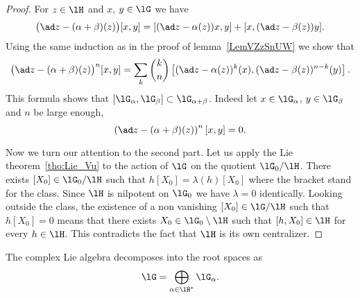 \begin{proof}
	For $z\in\lH$ and $x$, $y\in\lG$ we have
	\begin{equation}
		\big( \ad z-(\alpha+\beta)(z) \big)[x,y]=[ (\ad z-\alpha(z))x,y ]+[ x,(\ad z-\beta(z))y ].
	\end{equation}
	Using the same induction as in the proof of lemma~\ref{LemVZzSnUW} we show that
	\begin{equation}
		\big( \ad z-(\alpha+\beta)(z) \big)^n[x,y]=\sum_k \binom{k}{n}
		\left[
			(\ad z-\alpha(z))^k(x),(\ad z-\beta(z))^{n-k}(y)
			\right].
	\end{equation}
	This formula shows that $[\lG_{\alpha},\lG_{\beta}]\subset\lG_{\alpha+\beta}$. Indeed let $x\in\lG_{\alpha}$, $y\in\lG_{\beta}$ and $n$ be large enough,
	\begin{equation}
		\left( \ad z-(\alpha+\beta)(z) \right)^n[x,y]=0.
	\end{equation}

	Now we turn our attention to the second part. Let us apply the Lie theorem~\ref{tho:Lie_Vu} to the action of \( \lG\) on the quotient \( \lG_0/\lH\). There exists \( [X_0]\in\lG_0/\lH\) such that \( h[X_0]=\lambda(h)[X_0]\) where the bracket stand for the class. Since \( \lH\) is nilpotent on \( \lG_0\) we have \( \lambda=0\) identically. Looking outside the class, the existence of a non vanishing \( [X_0]\in\lG/\lH\) such that \( h[X_0]=0\) means that there exists \( X_0\in\lG_0\setminus\lH\) such that \( [h,X_0]\in\lH\) for every \( h\in\lH\). This contradicts the fact that \( \lH\) is its own centralizer.
\end{proof}

\begin{proposition}
	The complex Lie algebra decomposes into the root spaces as
	\begin{equation}
		\lG=\bigoplus_{\alpha\in\lH^*}\lG_{\alpha}.
	\end{equation}
\end{proposition}

